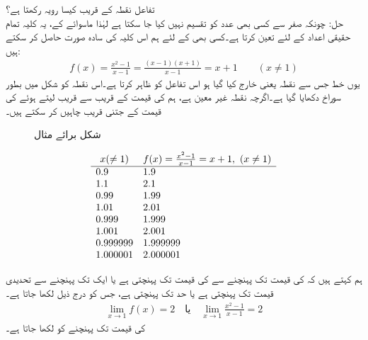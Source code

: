تفاعل  نقطہ  کے قریب کیسا رویہ رکھتا ہے؟\\
حل:\quad
چونکہ صفر سے کسی بھی عدد کو تقسیم نہیں کیا جا سکتا ہے لہٰذا ماسوائے  کے، یہ کلیہ تمام حقیقی اعداد کے لئے  تعین کرتا ہے۔کسی بھی  کے لئے ہم اس کلیہ کی سادہ صورت حاصل کر سکتے ہیں:
\begin{align*}
f(x)=\frac{x^2-1}{x-1}=\frac{(x-1)(x+1)}{x-1}=x+1\quad\quad (x\ne 1)
\end{align*} 
یوں خط  جس سے نقطہ  یعنی  خارج کیا گیا ہو اس تفاعل کو ظاہر کرتا ہے۔اس نقطہ کو شکل  میں بطور سوراخ دکھایا گیا ہے۔اگرچہ نقطہ  غیر معین ہے، ہم  کی قیمت  کے قریب سے قریب لیتے ہوئے  کی قیمت  کے جتنی قریب چاہیں کر سکتے ہیں۔
\begin{figure}
\centering
{}
\caption{شکل برائے مثال }
\label{شکل_مثال_حد_عجیب_تفاعل_الف}
\end{figure}
%
\begin{align*}
\begin{array}{ll}
\multicolumn{1}{c}{x (\ne 1)}&\multicolumn{1}{c}{f(x)=\tfrac{x^2-1}{x-1}=x+1,\,\, (x\ne 1)}\\
\hline
0.9&1.9\\
1.1&2.1\\
0.99&1.99\\
1.01&2.01\\
0.999&1.999\\
1.001&2.001\\
0.999999&1.999999\\
1.000001&2.000001
\end{array}
\end{align*}

ہم کہتے ہیں کہ  کی قیمت  تک پہنچنے سے  کی قیمت  تک پہنچتی ہے یا  ایک تک پہنچنے سے  تحدیدی قیمت  تک پہنچتی ہے یا حد  تک پہنچتی ہے، جس کو درج ذیل لکھا جاتا ہے۔
\begin{align*}
\lim_{x\to 1} f(x)=2 \quad \text{یا}\quad \lim_{x\to 1} \frac{x^2-1}{x-1}=2
\end{align*}
 کی قیمت  تک پہنچنے کو  لکھا جاتا ہے۔

